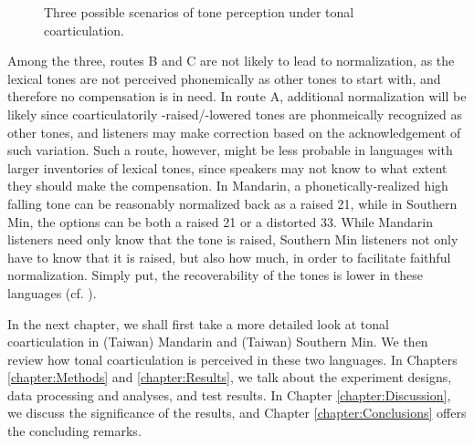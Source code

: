 \begin{figure}[hbt!]
\caption{Three possible scenarios of tone perception under tonal coarticulation.}
\label{Figure:ThreePossibleScenarios}
\end{figure}
Among the three, routes B and C are not likely to lead to normalization, as the lexical tones are not perceived phonemically as other tones to start with, and therefore no compensation is in need. In route A, additional normalization will be likely since coarticulatorily -raised/-lowered tones are phonmeically recognized as other tones, and listeners may make correction based on the acknowledgement of such variation. Such a route, however, might be less probable in languages with larger inventories of lexical tones, since speakers may not know to what extent they should make the compensation. In Mandarin, a phonetically-realized high falling tone can be reasonably normalized back as a raised 21, while in Southern Min, the options can be both a raised 21 or a distorted 33. While Mandarin listeners need only know that the tone is raised, Southern Min listeners not only have to know that it is raised, but also how much, in order to facilitate faithful normalization. Simply put, the recoverability of the tones is lower in these languages (cf. \citealp{Flemming2011}).

In the next chapter, we shall first take a more detailed look at tonal coarticulation in (Taiwan) Mandarin and (Taiwan) Southern Min. We then review how tonal coarticulation is perceived in these two languages. In Chapters \ref{chapter:Methods} and \ref{chapter:Results}, we talk about the experiment designs, data processing and analyses, and test results. In Chapter \ref{chapter:Discussion}, we discuss the significance of the results, and Chapter \ref{chapter:Conclusions} offers the concluding remarks.
